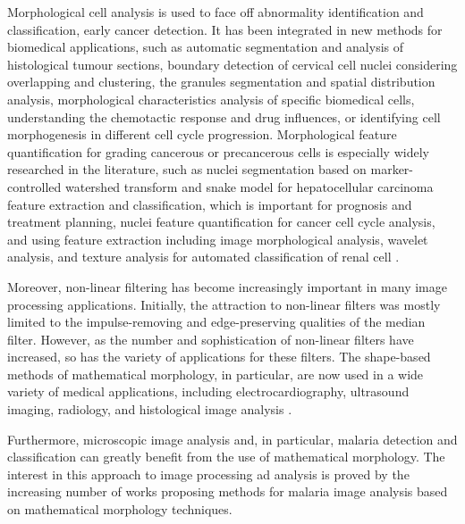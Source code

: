 \documentclass[sensors,review,submit,moreauthors,pdftex,10pt,a4paper]{mdpi}
\begin{document}
	Morphological cell analysis is used to face off abnormality identification and classification, early cancer detection. It has been integrated in new methods for biomedical applications, such as automatic segmentation and analysis of histological tumour sections, boundary detection of cervical cell nuclei considering overlapping and clustering, the granules segmentation and spatial distribution analysis, morphological characteristics analysis of specific biomedical cells, understanding the chemotactic response and drug influences, or identifying cell morphogenesis in different cell cycle progression.
	Morphological feature quantification for grading cancerous or precancerous cells is especially widely researched in the literature, such as nuclei segmentation based on marker-controlled watershed transform and snake model for hepatocellular carcinoma feature extraction and classification, which is important for prognosis and treatment planning, nuclei feature quantification for cancer cell cycle analysis, and using feature extraction including image morphological analysis, wavelet analysis, and texture analysis for automated classification of renal cell \cite{Chen2012}.
	
	Moreover, non-linear filtering has become increasingly important in many image processing applications. Initially, the attraction to non-linear filters was mostly limited to the impulse-removing and edge-preserving qualities of the median filter. However, as the number and sophistication of non-linear filters have increased, so has the variety of applications for these filters. The shape-based methods of mathematical morphology, in particular, are now used in a wide variety of medical applications, including electrocardiography, ultrasound imaging, radiology, and histological image analysis \cite{Schulze1994}.
	
	Furthermore, microscopic image analysis and, in particular, malaria detection and classification can greatly benefit from the use of mathematical morphology. The interest in this approach to image processing ad analysis is proved by the increasing number of works proposing methods for malaria image analysis based on mathematical morphology techniques.
	
\end{document}
